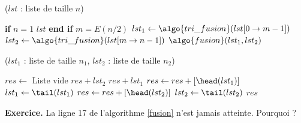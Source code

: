 

\begin{algorithm}[H]
\caption{($lst$ : liste de taille $n$)}
\begin{algorithmic}[1]
\State\textbf{if} $n=1$
	\Return $lst$
\textbf{end if}
\State $m = E(n/2)$ 
\State $lst_1 \gets \algo{tri\_fusion}(lst[0\rightarrow m-1])$
\State $lst_2 \gets \algo{tri\_fusion}(lst[m\rightarrow n-1])$
\State \Return $\algo{fusion}(lst_1, lst_2)$
\end{algorithmic}
\end{algorithm}

\begin{algorithm}[H]
\caption{($lst_1$ : liste de taille $n_1$, 
				      $lst_2$ : liste de taille $n_2$)}
\label{fusion}
\begin{algorithmic}[1]
\State $res\gets $ Liste vide
		\State\Return $res + lst_2$
    \EndIf
		\State\Return $res + lst_1$
   \EndIf
		\State $res\gets res + [\head(lst_1)]$
		\State $lst_1 \gets \tail(lst_1)$
	\Else
		\State $res\gets res + [\head(lst_2)]$
		\State $lst_2 \gets \tail(lst_2)$	
	\EndIf
\EndWhile
\State\Return $res$
\end{algorithmic}
\end{algorithm}

\textbf{Exercice.}
La ligne 17 de l'algorithme \ref{fusion} n'est jamais atteinte.
Pourquoi ?


